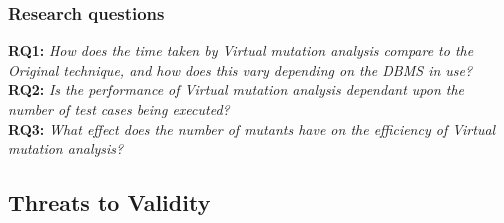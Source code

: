 		\subsubsection{Research questions}

			\textbf{RQ1: }\emph{How does the time taken by Virtual mutation analysis compare to the Original technique, and how does this vary depending on the DBMS in use?}\\


			\textbf{RQ2: }\emph{Is the performance of Virtual mutation analysis dependant upon the number of test cases being executed?}\\


			\textbf{RQ3: }\emph{What effect does the number of mutants have on the efficiency of Virtual mutation analysis?}\\


		

	\subsection{Threats to Validity}
